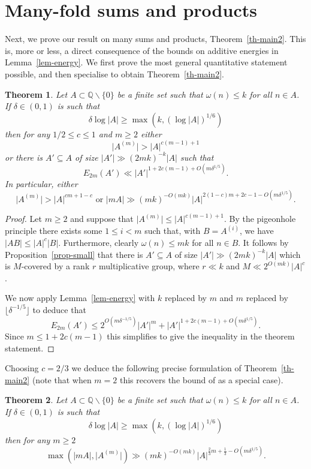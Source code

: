 \documentclass{amsart}
\renewcommand{\leq}{\leqslant}
\renewcommand{\geq}{\geqslant}
\newcommand{\bbq}{\mathbb{Q}}
\newcommand{\abs}[1]{\left\lvert #1\right\rvert}
\newcommand{\Abs}[1]{\lvert #1\rvert}
\newtheorem{theorem}{Theorem}
\theoremstyle{definition}
\begin{document}
\section{Many-fold sums and products}

Next, we prove our result on many sums and products, Theorem~\ref{th-main2}. This is, more or less, a direct consequence of the bounds on additive energies in Lemma~\ref{lem-energy}. We first prove the most general quantitative statement possible, and then specialise to obtain Theorem~\ref{th-main2}.

\begin{theorem}\label{th-main2precise}
Let $A\subset \bbq\backslash\{0\}$ be a finite set such that $\omega(n)\leq k$ for all $n\in A$. If $\delta\in (0,1)$ is such that
\[\delta \log \abs{A} \geq \max(k,(\log \abs{A})^{1/6})\]
then for any $1/2\leq c\leq 1$ and $m\geq 2$ either
\[\Abs{A^{(m)}}> \abs{A}^{c(m-1)+1}\]
or there is $A'\subseteq A$ of size $\abs{A'}\gg (2mk)^{-k}\abs{A}$ such that 
\[E_{2m}(A')\ll \abs{A'}^{1+2c(m-1)+O(m\delta^{1/5})}.\]
In particular, either
\[\Abs{A^{(m)}} > \abs{A}^{cm+1-c}\textrm{ or }\Abs{mA}\gg (mk)^{-O(mk)} \Abs{A}^{2(1-c)m+2c-1-O(m\delta^{1/5})}.\]
\end{theorem}
\begin{proof}
Let $m\geq 2$ and suppose that $\Abs{A^{(m)}}\leq \abs{A}^{c(m-1)+1}$. By the pigeonhole principle there exists some $1\leq i<m$ such that, with $B=A^{(i)}$, we have $\abs{AB}\leq \abs{A}^c\abs{B}$. Furthermore, clearly $\omega(n)\leq mk$ for all $n\in B$. It follows by Proposition~\ref{prop-small} that there is $A'\subseteq A$ of size $\abs{A'}\gg (2mk)^{-k}\abs{A}$ which is $M$-covered by a rank $r$ multiplicative group, where $r\ll k$ and $M\ll 2^{O(mk)}\abs{A}^c$.

We now apply Lemma~\ref{lem-energy} with $k$ replaced by $m$ and $m$ replaced by $\lfloor\delta^{-1/5}\rfloor$ to deduce that
\[E_{2m}(A') \leq 2^{O(m\delta^{-1/5})}\abs{A'}^m+\abs{A'}^{1+2c(m-1)+O(m\delta^{1/5})}.\]
Since $m\leq 1+2c(m-1)$ this simplifies to give the inequality in the theorem statement.
\end{proof}

Choosing $c=2/3$ we deduce the following precise formulation of Theorem~\ref{th-main2} (note that when $m=2$ this recovers the bound of \cite{HRSZ25} as a special case). 
\begin{theorem}
Let $A\subset \bbq\backslash\{0\}$ be a finite set such that $\omega(n)\leq k$ for all $n\in A$. If $\delta\in (0,1)$ is such that
\[\delta \log \abs{A} \geq \max(k,(\log \abs{A})^{1/6})\]
then for any $m\geq 2$
\[\max(\Abs{mA},\Abs{A^{(m)}}) \gg (mk)^{-O(mk)}\abs{A}^{\frac{2}{3}m+\frac{1}{3}-O(m\delta^{1/5})}.\]
\end{theorem}
\end{document}
